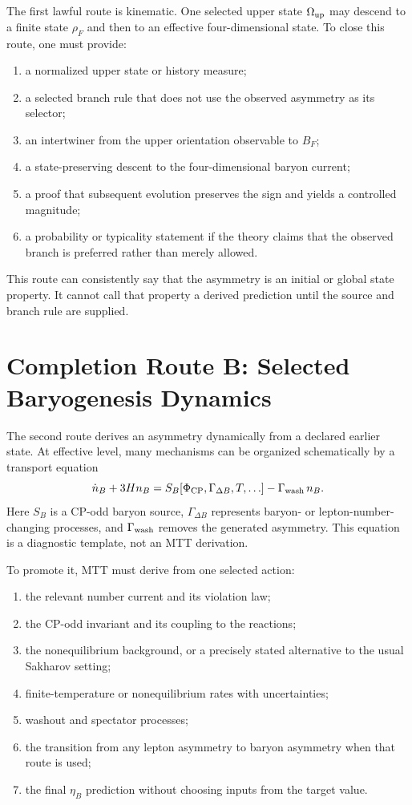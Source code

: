 \documentclass[11pt]{article}
\theoremstyle{definition}
\theoremstyle{remark}
\begin{document}
The first lawful route is kinematic.  One selected upper state
$\Omega_{\rm up}$ may descend to a finite state $\rho_F$ and then to an
effective four-dimensional state.  To close this route, one must provide:
\begin{enumerate}[label=\textbf{A\arabic*.}]
\item a normalized upper state or history measure;
\item a selected branch rule that does not use the observed asymmetry as its
selector;
\item an intertwiner from the upper orientation observable to $B_F$;
\item a state-preserving descent to the four-dimensional baryon current;
\item a proof that subsequent evolution preserves the sign and yields a
controlled magnitude;
\item a probability or typicality statement if the theory claims that the
observed branch is preferred rather than merely allowed.
\end{enumerate}

This route can consistently say that the asymmetry is an initial or global
state property.  It cannot call that property a derived prediction until the
source and branch rule are supplied.

\section{Completion Route B: Selected Baryogenesis Dynamics}

The second route derives an asymmetry dynamically from a declared earlier
state.  At effective level, many mechanisms can be organized schematically by
a transport equation
\[
 \dot n_B+3Hn_B=S_B[\Phi_{\rm CP},\Gamma_{\Delta B},T,\ldots]
 -\Gamma_{\rm wash}\,n_B .
\]
Here $S_B$ is a CP-odd baryon source, $\Gamma_{\Delta B}$ represents
baryon- or lepton-number-changing processes, and $\Gamma_{\rm wash}$ removes
the generated asymmetry.  This equation is a diagnostic template, not an MTT
derivation.

To promote it, MTT must derive from one selected action:
\begin{enumerate}[label=\textbf{B\arabic*.}]
\item the relevant number current and its violation law;
\item the CP-odd invariant and its coupling to the reactions;
\item the nonequilibrium background, or a precisely stated alternative to
the usual Sakharov setting;
\item finite-temperature or nonequilibrium rates with uncertainties;
\item washout and spectator processes;
\item the transition from any lepton asymmetry to baryon asymmetry when that
route is used;
\item the final $\eta_B$ prediction without choosing inputs from the target
value.
\end{enumerate}
\end{document}
